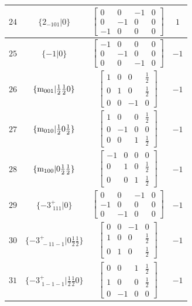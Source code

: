 \documentclass[fleqn,8pt]{jsarticle}
\begin{document}
\begin{longtable}{cccc}
$ 24 $ & $ \{2{}_{-101}|0\} $ & $ \begin{bmatrix} 0 & 0 & -1 & 0 \\ 0 & -1 & 0 & 0 \\ -1 & 0 & 0 & 0 \end{bmatrix} $ & $ 1 $ \\ \hline
$ 25 $ & $ \{-1|0\} $ & $ \begin{bmatrix} -1 & 0 & 0 & 0 \\ 0 & -1 & 0 & 0 \\ 0 & 0 & -1 & 0 \end{bmatrix} $ & $ -1 $ \\ \hline
$ 26 $ & $ \{{\rm m}_{001}|\frac{1}{2} \frac{1}{2} 0\} $ & $ \begin{bmatrix} 1 & 0 & 0 & \frac{1}{2} \\ 0 & 1 & 0 & \frac{1}{2} \\ 0 & 0 & -1 & 0 \end{bmatrix} $ & $ -1 $ \\ \hline
$ 27 $ & $ \{{\rm m}_{010}|\frac{1}{2} 0 \frac{1}{2}\} $ & $ \begin{bmatrix} 1 & 0 & 0 & \frac{1}{2} \\ 0 & -1 & 0 & 0 \\ 0 & 0 & 1 & \frac{1}{2} \end{bmatrix} $ & $ -1 $ \\ \hline
$ 28 $ & $ \{{\rm m}_{100}|0 \frac{1}{2} \frac{1}{2}\} $ & $ \begin{bmatrix} -1 & 0 & 0 & 0 \\ 0 & 1 & 0 & \frac{1}{2} \\ 0 & 0 & 1 & \frac{1}{2} \end{bmatrix} $ & $ -1 $ \\ \hline
$ 29 $ & $ \{-3^{+}_{\,\,111}|0\} $ & $ \begin{bmatrix} 0 & 0 & -1 & 0 \\ -1 & 0 & 0 & 0 \\ 0 & -1 & 0 & 0 \end{bmatrix} $ & $ -1 $ \\ \hline
$ 30 $ & $ \{-3^{+}_{\,\,-11-1}|0 \frac{1}{2} \frac{1}{2}\} $ & $ \begin{bmatrix} 0 & 0 & -1 & 0 \\ 1 & 0 & 0 & \frac{1}{2} \\ 0 & 1 & 0 & \frac{1}{2} \end{bmatrix} $ & $ -1 $ \\ \hline
$ 31 $ & $ \{-3^{+}_{\,\,1-1-1}|\frac{1}{2} \frac{1}{2} 0\} $ & $ \begin{bmatrix} 0 & 0 & 1 & \frac{1}{2} \\ 1 & 0 & 0 & \frac{1}{2} \\ 0 & -1 & 0 & 0 \end{bmatrix} $ & $ -1 $ \\ \hline

\end{longtable}
\end{document}
